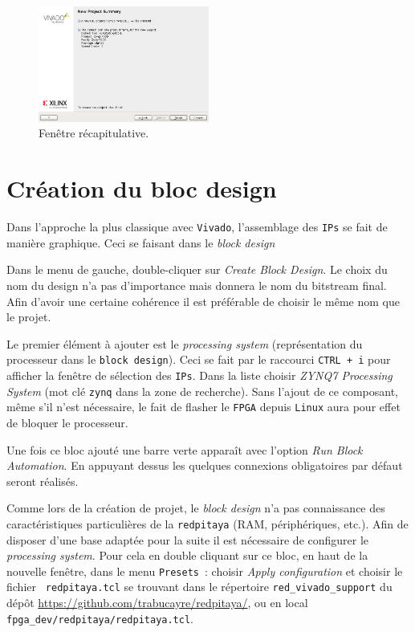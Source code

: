 \documentclass[12pt,oneside]{article}
\begin{document}
\begin{figure}[h!tb]
\begin{center}
\includegraphics[width=0.5\textwidth]{./createProj_summary.png}
\end{center}
\caption{Fen\^etre r\'ecapitulative.}
\label{createProj_summary}
\end{figure}

\section{Cr\'eation du bloc design}

Dans l'approche la plus classique avec {\tt Vivado}, l'assemblage des {\tt IPs}
se fait de mani\`ere graphique. Ceci se faisant dans le {\em block design}

Dans le menu de gauche, double-cliquer sur {\em Create Block Design}. Le choix
du nom du design n'a pas d'importance mais donnera le nom du bitstream final.
Afin d'avoir une certaine coh\'erence il est pr\'ef\'erable de choisir le m\^eme nom
que le projet.

Le premier \'el\'ement \`a ajouter est le {\em processing system}
(repr\'esentation du processeur dans le {\tt block design}). Ceci se fait
par le raccourci {\tt CTRL + i} pour afficher la fen\^etre de s\'election des
{\tt IPs}. Dans la liste choisir {\em ZYNQ7 Processing System} (mot cl\'e
{\tt zynq} dans la zone de recherche). Sans l'ajout de
ce composant, même s'il n'est n\'ecessaire, le fait de flasher le {\tt FPGA}
depuis {\tt Linux} aura pour effet de bloquer le processeur.

Une fois ce bloc ajout\'e une barre verte appara\^it avec l'option {\em Run
Block Automation}. En appuyant dessus les quelques connexions obligatoires par
d\'efaut seront r\'ealis\'es. 

Comme lors de la cr\'eation de projet, le {\em block design} n'a pas
connaissance des caract\'eristiques particuli\`eres de la {\tt redpitaya} (RAM,
p\'eriph\'eriques, etc.). Afin de disposer d'une base adapt\'ee pour la suite
il est n\'ecessaire de configurer le {\em processing system}. Pour cela en
double cliquant sur ce bloc, en haut de la nouvelle fen\^etre, dans le menu
{\tt Presets}~: choisir {\em Apply configuration} et choisir le fichier {\tt
redpitaya.tcl} se trouvant dans le r\'epertoire {\tt red\_vivado\_support} du
d\'ep\^ot \url{https://github.com/trabucayre/redpitaya/}, ou en local
{\tt fpga\_dev/redpitaya/redpitaya.tcl}.
\end{document}
